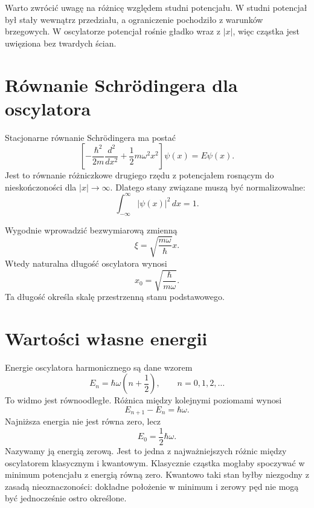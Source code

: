 Warto zwrócić uwagę na różnicę względem studni potencjału. W studni potencjał był stały wewnątrz przedziału, a ograniczenie pochodziło z warunków brzegowych. W oscylatorze potencjał rośnie gładko wraz z \(|x|\), więc cząstka jest uwięziona bez twardych ścian.

\section{Równanie Schrödingera dla oscylatora}

Stacjonarne równanie Schrödingera ma postać
\begin{equation}
    \left[-\frac{\hbar^2}{2m}\frac{d^2}{dx^2}+\frac{1}{2}m\omega^2x^2\right]\psi(x)=E\psi(x).
\end{equation}
Jest to równanie różniczkowe drugiego rzędu z potencjałem rosnącym do nieskończoności dla \(|x|\to\infty\). Dlatego stany związane muszą być normalizowalne:
\begin{equation}
    \int_{-\infty}^{\infty}|\psi(x)|^2\,dx=1.
\end{equation}

Wygodnie wprowadzić bezwymiarową zmienną
\begin{equation}
    \xi=\sqrt{\frac{m\omega}{\hbar}}x.
\end{equation}
Wtedy naturalna długość oscylatora wynosi
\begin{equation}
    x_0=\sqrt{\frac{\hbar}{m\omega}}.
\end{equation}
Ta długość określa skalę przestrzenną stanu podstawowego.

\section{Wartości własne energii}

Energie oscylatora harmonicznego są dane wzorem
\begin{equation}
    E_n=\hbar\omega\left(n+\frac{1}{2}\right),
    \qquad
    n=0,1,2,\ldots
\end{equation}
To widmo jest równoodległe. Różnica między kolejnymi poziomami wynosi
\begin{equation}
    E_{n+1}-E_n=\hbar\omega.
\end{equation}
Najniższa energia nie jest równa zero, lecz
\begin{equation}
    E_0=\frac{1}{2}\hbar\omega.
\end{equation}
Nazywamy ją energią zerową. Jest to jedna z najważniejszych różnic między oscylatorem klasycznym i kwantowym. Klasycznie cząstka mogłaby spoczywać w minimum potencjału z energią równą zero. Kwantowo taki stan byłby niezgodny z zasadą nieoznaczoności: dokładne położenie w minimum i zerowy pęd nie mogą być jednocześnie ostro określone.

